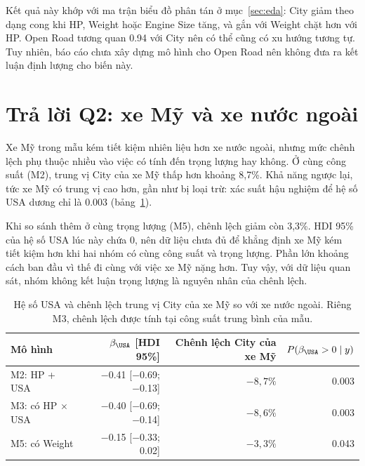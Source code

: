 \documentclass[12pt,a4paper]{report}
\begin{document}
Kết quả này khớp với ma trận biểu đồ phân tán ở mục~\ref{sec:eda}: City giảm
theo dạng cong khi HP, Weight hoặc Engine Size tăng, và gắn với Weight chặt hơn
với HP. Open Road tương quan \num{0.94} với City nên có thể cũng có xu hướng
tương tự. Tuy nhiên, báo cáo chưa xây dựng mô hình cho Open Road nên không đưa
ra kết luận định lượng cho biến này.


\section{Trả lời Q2: xe Mỹ và xe nước ngoài}
\label{sec:q2}

Xe Mỹ trong mẫu kém tiết kiệm nhiên liệu hơn xe nước ngoài, nhưng mức chênh
lệch phụ thuộc nhiều vào việc có tính đến trọng lượng hay không. Ở cùng công
suất (M2), trung vị City của xe Mỹ thấp hơn khoảng 8{,}7\%. Khả năng ngược lại,
tức xe Mỹ có trung vị cao hơn, gần như bị loại trừ: xác suất hậu nghiệm để hệ
số USA dương chỉ là \num{0.003} (bảng~\ref{tab:q2}).

Khi so sánh thêm ở cùng trọng lượng (M5), chênh lệch giảm còn 3{,}3\%. HDI 95\%
của hệ số USA lúc này chứa 0, nên dữ liệu chưa đủ để khẳng định xe Mỹ kém tiết
kiệm hơn khi hai nhóm có cùng công suất và trọng lượng. Phần lớn khoảng cách ban
đầu vì thế đi cùng với việc xe Mỹ nặng hơn. Tuy vậy, với dữ liệu quan sát, nhóm
không kết luận trọng lượng là nguyên nhân của chênh lệch.

\begin{table}[tp]
  \centering
  \caption{Hệ số USA và chênh lệch trung vị City của xe Mỹ so với xe nước ngoài.
    Riêng M3, chênh lệch được tính tại công suất trung bình của mẫu.}
  \label{tab:q2}
  \begin{tabular}{lrrr}
    \toprule
    Mô hình & $\beta_{\USA}$ [HDI 95\%] & Chênh lệch City của xe Mỹ & $P(\beta_{\USA} > 0 \mid y)$ \\
    \midrule
    M2: HP + USA         & \num{-0.41} [\num{-0.69}; \num{-0.13}] & $-8{,}7\%$ & \num{0.003} \\
    M3: có HP $\times$ USA & \num{-0.40} [\num{-0.69}; \num{-0.14}] & $-8{,}6\%$ & \num{0.003} \\
    M5: có Weight        & \num{-0.15} [\num{-0.33}; \num{0.02}]  & $-3{,}3\%$ & \num{0.043} \\
    \bottomrule
  \end{tabular}
\end{table}
\end{document}
